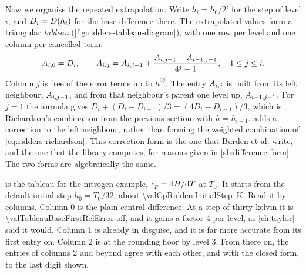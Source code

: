 Now we organise the repeated extrapolation. Write $h_i = h_0 / 2^i$ for the step of level $i$, and $D_i = D(h_i)$
for the base difference there. The extrapolated values form a triangular \emph{tableau}
(\cref{fig:ridders-tableau-diagram}), with one row per level and one column per cancelled term:
\begin{equation}
  A_{i,0} = D_i, \qquad
  A_{i,j} = A_{i,j-1} + \frac{A_{i,j-1} - A_{i-1,j-1}}{4^j - 1}, \quad 1 \le j \le i .
  \label{eq:ridders-tableau}
\end{equation}
Column $j$ is free of the error terms up to $h^{2j}$. The entry $\Aij{i}{j}$ is built from its left neighbour,
$A_{i,j-1}$, and from that neighbour's parent one level up, $A_{i-1,j-1}$. For $j = 1$ the formula gives
$D_i + (D_i - D_{i-1}) / 3 = (4 D_i - D_{i-1}) / 3$, which is Richardson's combination from the previous section,
with $h = h_{i-1}$.  adds a correction to the left neighbour, rather than forming the
weighted combination of \cref{eq:ridders-richardson}. This correction form is the one that Burden et al. write, and
the one that the library computes, for reasons given in \cref{sb:difference-form}. The two forms are algebraically
the same.

\begin{table}
\caption{Ridders' tableau for $\cp$ at $T_0$, from $h_0 = T_0 / 32$, over the \num{\valTableauLevelsUsed} levels
that the method used. The upper table holds the entries $\Aij{i}{j}$. The lower table holds their relative errors,
with the rounding floor $r_i$ of each level. The entry that Ridders returned (level \num{\valTableauBestLevel},
column \num{\valTableauBestColumn}) is in the accent colour.\label{tab:ridders-tableau}}
\centering

\end{table}

 is the tableau for the nitrogen example, $c_p = \mathrm{d} H / \mathrm{d} T$ at $T_0$. It starts
from the default initial step $h_0 = T_0 / 32$, about \SI{\valCpRiddersInitialStep}{\kelvin}. Read it by columns.
Column 0 is the plain central difference. At a step of thirty kelvin it is \num{\valTableauBaseFirstRelError} off,
and it gains a factor 4 per level, as \cref{ch:taylor} said it would. Column 1 is already  in
disguise, and it is far more accurate from its first entry on. Column 2 is at the rounding floor by level 3. From
there on, the entries of columns 2 and beyond agree with each other, and with the closed form, to the last digit
shown.

